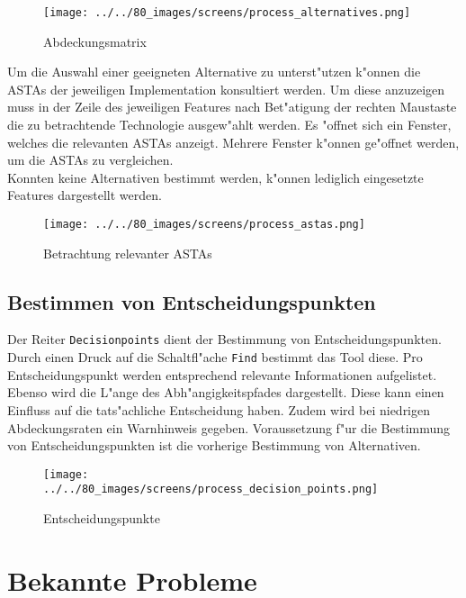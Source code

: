 \documentclass{proc}
\begin{document}
	\begin{figure}[h!]
		\centering
		\caption{Abdeckungsmatrix}
		\texttt{[image: ../../80\_images/screens/process\_alternatives.png]}
	\end{figure}
	
	Um die Auswahl einer geeigneten Alternative zu unterst"utzen k"onnen die ASTAs der jeweiligen Implementation konsultiert werden.
	Um diese anzuzeigen muss in der Zeile des jeweiligen Features nach Bet"atigung der rechten Maustaste die zu betrachtende Technologie ausgew"ahlt werden.
	Es "offnet sich ein Fenster, welches die relevanten ASTAs anzeigt.
	Mehrere Fenster k"onnen ge"offnet werden, um die ASTAs zu vergleichen.
	\\
	Konnten keine Alternativen bestimmt werden, k"onnen lediglich eingesetzte Features dargestellt werden.

	\begin{figure}[h!]
		\centering
		\caption{Betrachtung relevanter ASTAs}
		\texttt{[image: ../../80\_images/screens/process\_astas.png]}
	\end{figure}
	
	\subsection{Bestimmen von Entscheidungspunkten}
	
	Der Reiter \texttt{Decisionpoints} dient der Bestimmung von Entscheidungspunkten.
	Durch einen Druck auf die Schaltfl"ache \texttt{Find} bestimmt das Tool diese.
	Pro Entscheidungspunkt werden entsprechend relevante Informationen aufgelistet.
	Ebenso wird die L"ange des Abh"angigkeitspfades dargestellt.
	Diese kann einen Einfluss auf die tats"achliche Entscheidung haben.
	Zudem wird bei niedrigen Abdeckungsraten ein Warnhinweis gegeben.
	Voraussetzung f"ur die Bestimmung von Entscheidungspunkten ist die vorherige Bestimmung von Alternativen.
	
	\begin{figure}[h!]
		\centering
		\caption{Entscheidungspunkte}
		\texttt{[image: ../../80\_images/screens/process\_decision\_points.png]}
	\end{figure}
	
	\section{Bekannte Probleme}
	
\end{document}
